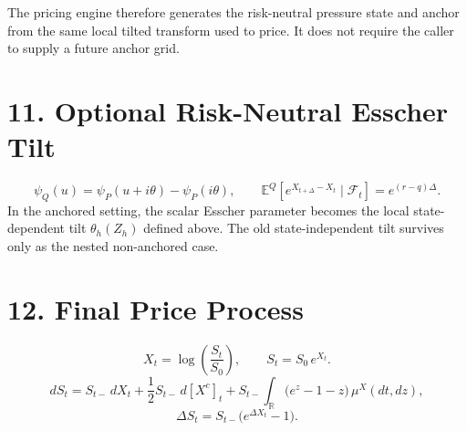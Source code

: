 \documentclass[11pt]{article}
\begin{document}
The pricing engine therefore generates the risk-neutral pressure state and
anchor from the same local tilted transform used to price. It does not require
the caller to supply a future anchor grid.

\section*{11. Optional Risk-Neutral Esscher Tilt}
\[
\psi_Q(u)=\psi_P(u+i\theta)-\psi_P(i\theta),
\qquad
\mathbb{E}^Q\!\left[e^{X_{t+\Delta}-X_t}\mid\mathcal{F}_t\right]=e^{(r-q)\Delta}.
\]
In the anchored setting, the scalar Esscher parameter becomes the local
state-dependent tilt \(\theta_h(Z_h)\) defined above. The old state-independent
tilt survives only as the nested non-anchored case.

\section*{12. Final Price Process}
\[
X_t=\log\!\left(\frac{S_t}{S_0}\right),
\qquad
S_t=S_0\,e^{X_t}.
\]
\[
dS_t
=
S_{t-}\,dX_t
+\frac{1}{2}S_{t-}\,d[X^c]_t
+S_{t-}\!\int_{\mathbb{R}}\!\big(e^{z}-1-z\big)\,\mu^X(dt,dz),
\]
\[
\Delta S_t = S_{t-}\big(e^{\Delta X_t}-1\big).
\]
\end{document}
